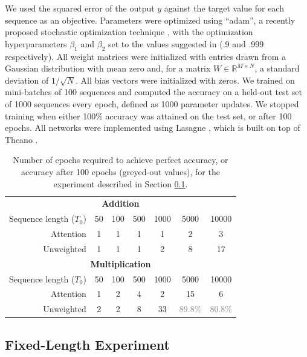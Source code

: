 \documentclass{article} %
\begin{document}
We used the squared error of the output $y$ against the target value for each sequence as an objective.
Parameters were optimized using ``adam'', a recently proposed stochastic optimization technique \cite{kingma2014adam}, with the optimization hyperparameters $\beta_1$ and $\beta_2$ set to the values suggested in \cite{kingma2014adam} (.9 and .999 respectively).
All weight matrices were initialized with entries drawn from a Gaussian distribution with mean zero and, for a matrix $W \in \mathbb{R}^{M \times N}$, a standard deviation of $1/\sqrt{N}$.
All bias vectors were initialized with zeros.
We trained on mini-batches of 100 sequences and computed the accuracy on a held-out test set of 1000 sequences every epoch, defined as 1000 parameter updates.
We stopped training when either 100\% accuracy was attained on the test set, or after 100 epochs.
All networks were implemented using Lasagne \cite{dieleman2015lasagne}, which is built on top of Theano \cite{bastien2012theano,bergstra2010theano}.

\begin{table}
  \centering
  \begin{tabular}{r c c c c c c}
    \toprule
    \multicolumn{7}{c}{\textbf{Addition}} \\
    Sequence length ($T_0$) & 50 & 100 & 500 & 1000 & 5000 & 10000 \\
    \cmidrule(r){2-7}
    Attention & 1 & 1 & 1 & 1 & 2 & 3 \\
    Unweighted & 1 & 1 & 1 & 2 & 8 & 17 \\
    \midrule
    \multicolumn{7}{c}{\textbf{Multiplication}} \\
    Sequence length ($T_0$) & 50 & 100 & 500 & 1000 & 5000 & 10000 \\
    \cmidrule(r){2-7}
    Attention & 1 & 2 & 4 & 2 & 15 & 6 \\
    Unweighted & 2 & 2 & 8 & 33 & \textcolor{gray}{89.8\%} & \textcolor{gray}{80.8\%} \\
    \bottomrule
  \end{tabular}
  \caption{Number of epochs required to achieve perfect accuracy, or accuracy after 100 epochs (greyed-out values), for the experiment described in Section \ref{sec:fixed}.}
  \label{tab:fixed}
\end{table}
\setlength{\textfloatsep}{14pt}

\subsection{Fixed-Length Experiment}
\label{sec:fixed}
\end{document}
